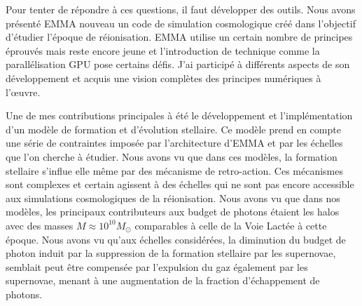 Pour tenter de répondre à ces questions, il faut développer des outils.
Nous avons présenté EMMA nouveau un code de simulation cosmologique créé dans l'objectif d'étudier l'époque de réionisation.
EMMA utilise un certain nombre de principes éprouvés mais reste encore jeune et l'introduction de technique comme la parallélisation GPU pose certains défis.
J'ai participé à différents aspects de son développement et acquis une vision complètes des principes numériques à l’œuvre.

Une de mes contributions principales à été le développement et l'implémentation d'un modèle de formation et d'évolution stellaire.
Ce modèle prend en compte une série de contraintes imposée par l’architecture d'EMMA et par les échelles que l'on cherche à étudier.
Nous avons vu que dans ces modèles, la formation stellaire s'influe elle même par des mécanisme de retro-action.
Ces mécanismes sont complexes et certain agissent à des échelles qui ne sont pas encore accessible aux simulations cosmologiques de la réionisation.
Nous avons vu que dans nos modèles, les principaux contributeurs aux budget de photons étaient les halos avec des masses $M \approx 10^{10}M_\odot$ comparables à celle de la Voie Lactée à cette époque.
Nous avons vu qu'aux échelles considérées, la diminution du budget de photon induit par la suppression de la formation stellaire par les supernovae, semblait peut être compensée par l'expulsion du gaz également par les supernovae, menant à une augmentation de la fraction d'échappement de photons.

